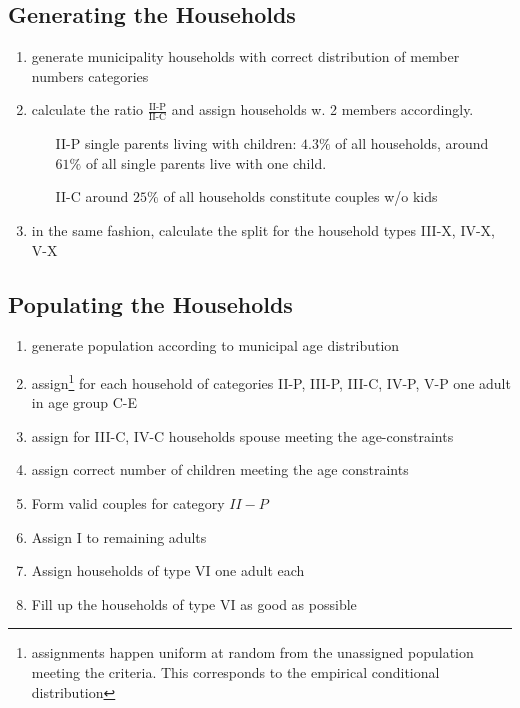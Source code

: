 \documentclass[]{scrartcl}
\begin{document}
	\subsection{Generating the Households}
	\begin{enumerate}
		\item generate municipality households with correct distribution of member numbers categories
		 \item calculate the ratio $\frac{\text{II-P}}{\text{II-C}}$ and assign households w. 2 members accordingly.
		 \begin{itemize}
		 \item[II-P] single parents living with children: $4.3\%$ of all households, around $61\%$ of all single parents live with one child. 
		\item[II-C]
		 around $25\%$ of all households constitute couples w/o kids
		\end{itemize}
		\item in the same fashion, calculate the split for the household types III-X, IV-X, V-X	
	\end{enumerate}
	\subsection{Populating the Households}
	\begin{enumerate}	
		\item generate population according to municipal age distribution
		\item assign\footnote{assignments happen uniform at random from the unassigned population meeting the criteria. This corresponds to the empirical conditional distribution} for each household of categories II-P, III-P, III-C, IV-P, V-P one adult in age group C-E
		\item assign for III-C, IV-C households spouse meeting the age-constraints
		\item assign correct number of children meeting the age constraints
		\item Form valid couples for category $II-P$
		\item Assign I to remaining adults
		\item Assign households of type VI one adult each
		\item Fill up the households of type VI as good as possible
	\end{enumerate}
	
\end{document}
